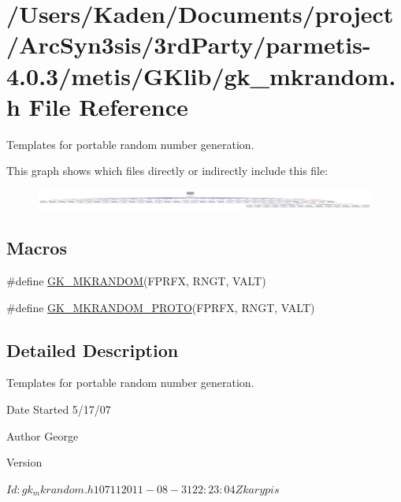 \hypertarget{a00068}{}\section{/\+Users/\+Kaden/\+Documents/project/\+Arc\+Syn3sis/3rd\+Party/parmetis-\/4.0.3/metis/\+G\+Klib/gk\+\_\+mkrandom.h File Reference}
\label{a00068}


Templates for portable random number generation.  


This graph shows which files directly or indirectly include this file\+:\nopagebreak
\begin{figure}[H]
\begin{center}
\leavevmode
\includegraphics[width=350pt]{a00070}
\end{center}
\end{figure}
\subsection*{Macros}
\begin{DoxyCompactItemize}
\item 
\#define \hyperlink{a00068_aea34b11226c16f61ff23b0487f2756e5}{G\+K\+\_\+\+M\+K\+R\+A\+N\+D\+OM}(F\+P\+R\+FX,  R\+N\+GT,  V\+A\+LT)
\item 
\#define \hyperlink{a00068_a0a53a46698857b540420db848936c6ac}{G\+K\+\_\+\+M\+K\+R\+A\+N\+D\+O\+M\+\_\+\+P\+R\+O\+TO}(F\+P\+R\+FX,  R\+N\+GT,  V\+A\+LT)
\end{DoxyCompactItemize}


\subsection{Detailed Description}
Templates for portable random number generation. 

\begin{DoxyDate}{Date}
Started 5/17/07 
\end{DoxyDate}
\begin{DoxyAuthor}{Author}
George 
\end{DoxyAuthor}
\begin{DoxyVersion}{Version}
\begin{DoxyVerb}$Id: gk_mkrandom.h 10711 2011-08-31 22:23:04Z karypis $ \end{DoxyVerb}
 
\end{DoxyVersion}


